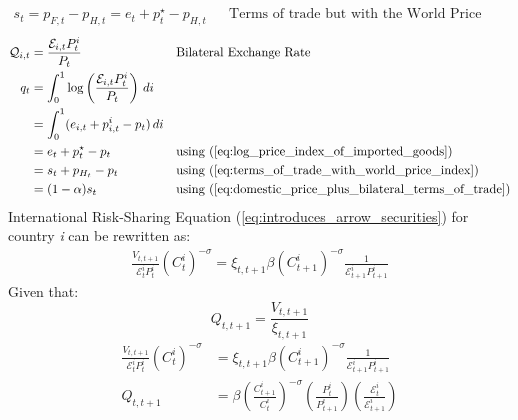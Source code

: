 \begin{align}
    s_t = p_{F,t} - p_{H,t} = e_t + p_t^{\star} - p_{H,t} \label{eq:terms_of_trade_with_world_price_index} &  & \text{Terms of trade but with the World Price Index}
\end{align}
\begin{align}
    \mathcal{Q}_{i,t} & = \frac{\mathcal{E}_{i,t}P_{t}^i}{P_t}                                        &  & \text{Bilateral Exchange Rate}                                       \\
    q_t               & = \int_{0}^{1} \log \left( \frac{\mathcal{E}_{i,t}P_{t}^i}{P_t} \right) \, di                                                                           \\
                      & = \int_{0}^{1} (e_{i,t} + p_{i,t}^i - p_t) \, di                              &  &                                                                      \\
                      & = e_t + p_t^{\star} - p_t                                                     &  & \text{using (\ref{eq:log_price_index_of_imported_goods})}            \\
                      & = s_t + p_{H_t} - p_t                                                         &  & \text{using (\ref{eq:terms_of_trade_with_world_price_index})}        \\
                      & = (1-\alpha)s_t                                                               &  & \text{using (\ref{eq:domestic_price_plus_bilateral_terms_of_trade})}
\end{align}
International Risk-Sharing Equation (\ref{eq:introduces_arrow_securities}) for country \textit{i} can be rewritten as:
\begin{align}
    \frac{V_{t,t+1}}{\mathcal{E}^i_tP^i_t}({C^{i}_{t}})^{-\sigma} = \xi_{t,t+1} \beta ({C^{i}_{t+1}})^{-\sigma} \frac{1}{\mathcal{E}^i_{t+1}P^{i}_{t+1}}
\end{align}
Given that:
\begin{equation}
    Q_{t,t+1} = \frac{V_{t,t+1}}{\xi_{t,t+1}}
\end{equation}
\begin{align}
    \frac{V_{t,t+1}}{\mathcal{E}^i_tP^i_t}({C^{i}_{t}})^{-\sigma}         & = \xi_{t,t+1} \beta ({C^{i}_{t+1}})^{-\sigma} \frac{1}{\mathcal{E}^i_{t+1}P^{i}_{t+1}}                                                                    \\
    Q_{t,t+1}                                                             & = \beta \left(\frac{C^i_{t+1}}{C^i_{t}}\right)^{-\sigma} \left(\frac{P^i_t}{P^i_{t+1}}\right) \left(\frac{\mathcal{E}^i_{t}}{\mathcal{E}^i_{t+1}} \right) 
\end{align}
